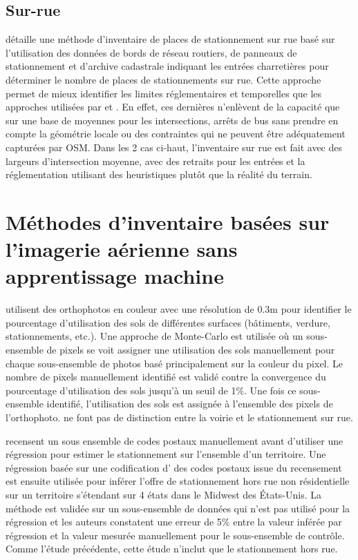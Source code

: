   \subsection{Sur-rue}
  \textcite{bourdeau_methodologie_2014} détaille une méthode d'inventaire de places de stationnement sur rue basé sur l'utilisation des données de bords de réseau routiers, de panneaux de stationnement et d'archive cadastrale indiquant les entrées charretières pour déterminer le nombre de places de stationnements sur rue. Cette approche permet de mieux identifier les limites réglementaires et temporelles que les approches utilisées par \textcite{chester_inventorying_2022} et \textcite{scharnhorst_quantified_2018}. En effet, ces dernières n'enlèvent de la capacité que sur une base de moyennes pour les intersections, arrêts de bus sans prendre en compte la géométrie locale ou des contraintes qui ne peuvent être adéquatement capturées par \ac{OSM}. Dans les 2 cas ci-haut, l'inventaire sur rue est fait avec des largeurs d'intersection moyenne, avec des retraits pour les entrées et la réglementation utilisant des heuristiques plutôt que la réalité du terrain. \par
\section{Méthodes d'inventaire basées sur l'imagerie aérienne sans apprentissage machine}
  \textcite{akbari_analyzing_2003} utilisent des orthophotos en couleur avec une résolution de 0.3m pour identifier le pourcentage d'utilisation des sols de différentes surfaces (bâtiments, verdure, stationnements, etc.). Une approche de Monte-Carlo est utilisée où un sous-ensemble de pixels se voit assigner une utilisation des sols manuellement pour chaque sous-ensemble de photos basé principalement sur la couleur du pixel. Le nombre de pixels manuellement identifié est validé contre la convergence du pourcentage d'utilisation des sols jusqu'à un seuil de 1\%. Une fois ce sous-ensemble identifié, l'utilisation des sols est assignée à l'ensemble des pixels de l'orthophoto. \citeauthor{akbari_analyzing_2003} ne font pas de distinction entre la voirie et le stationnement sur rue.\par
  \textcite{davis_estimating_2010} recensent un sous ensemble de codes postaux manuellement avant d'utiliser une régression pour estimer le stationnement sur l'ensemble d'un territoire. Une régression basée sur une codification d' \fg{} des codes postaux issue du recensement est ensuite utilisée pour inférer l'offre de stationnement hors rue non résidentielle sur un territoire s'étendant sur 4 états dans le Midwest des États-Unis. La méthode est validée sur un sous-ensemble de données qui n'est pas utilisé pour la régression et les auteurs constatent une erreur de 5\% entre la valeur inférée par régression et la valeur mesurée manuellement pour le sous-ensemble de contrôle. Comme l'étude précédente, cette étude n'inclut que le stationnement hors rue. \par
